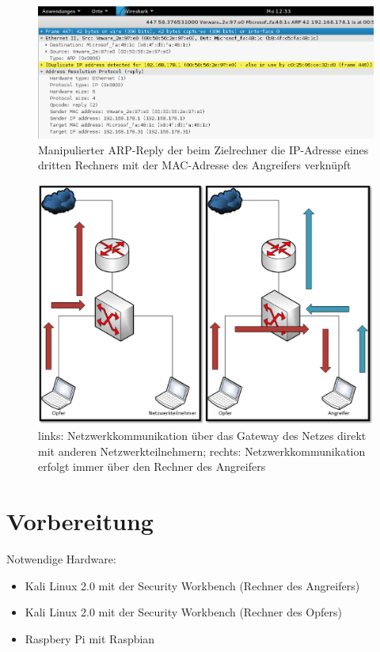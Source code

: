 \begin{figure}
	\centering
	\includegraphics[width=\textwidth]{images/arp/ARP_Fake_Reply}
	\caption{Manipulierter ARP-Reply der beim Zielrechner die IP-Adresse eines dritten Rechners mit der MAC-Adresse des Angreifers verknüpft}
	\label{fig:arp_fake_reply}
\end{figure}

\begin{figure}
	\centering
	\includegraphics[width=\textwidth]{images/arp/Netzwerkverkehr_Vergleich}
	\caption{links: Netzwerkkommunikation über das Gateway des Netzes direkt mit anderen Netzwerkteilnehmern; rechts: Netzwerkkommunikation erfolgt immer über den Rechner des Angreifers}
	\label{fig:netzwerkverkehr_vergleich}
\end{figure}

\section{Vorbereitung}
Notwendige Hardware:

\begin{itemize}
	\item Kali Linux 2.0 mit der Security Workbench (Rechner des Angreifers)
	\item Kali Linux 2.0 mit der Security Workbench (Rechner des Opfers)
	\item Raspbery Pi mit Raspbian
\end{itemize}

